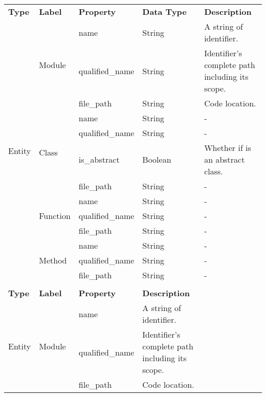 \begin{tabular}{|p{1.6cm}|p{1.7cm}|p{2cm}|p{3.3cm}|p{7.5cm}|}
\hline
\textbf{Type} & \textbf{Label} & \textbf{Property} & \textbf{Data Type} & \textbf{Description} \\
\cline{1-1}\cline{2-2}\cline{3-3}\cline{4-4}\cline{5-5}
\multirow{13}{*}{Entity} & \multirow{3}{*}{Module} & name & String & A string of identifier. \\
\cline{3-3}\cline{4-4}\cline{5-5}
 &  & qualified\_name & String & Identifier's complete path including its scope. \\
\cline{3-3}\cline{4-4}\cline{5-5}
 &  & file\_path & String & Code location. \\
\cline{2-2}\cline{3-3}\cline{4-4}\cline{5-5}
 & \multirow{4}{*}{Class} & name & String & - \\
\cline{3-3}\cline{4-4}\cline{5-5}
 &  & qualified\_name & String & - \\
\cline{3-3}\cline{4-4}\cline{5-5}
 &  & is\_abstract & Boolean & Whether if is an abstract class. \\
\cline{3-3}\cline{4-4}\cline{5-5}
 &  & file\_path & String & - \\
\cline{2-2}\cline{3-3}\cline{4-4}\cline{5-5}
 & \multirow{3}{*}{Function} & name & String & - \\
\cline{3-3}\cline{4-4}\cline{5-5}
 &  & qualified\_name & String & - \\
\cline{3-3}\cline{4-4}\cline{5-5}
 &  & file\_path & String & - \\
\cline{2-2}\cline{3-3}\cline{4-4}\cline{5-5}
 & \multirow{3}{*}{Method} & name & String & - \\
\cline{3-3}\cline{4-4}\cline{5-5}
 &  & qualified\_name & String & - \\
\cline{3-3}\cline{4-4}\cline{5-5}
 &  & file\_path & String & - \\
\cline{1-1}\cline{2-2}\cline{3-3}\cline{4-4}\cline{5-5}
 &  &  &  &  \\
\cline{1-1}\cline{2-2}\cline{3-3}\cline{4-4}\cline{5-5}
\textbf{Type} & \textbf{Label} & \textbf{Property} & \textbf{Description} &  \\
\cline{1-1}\cline{2-2}\cline{3-3}\cline{4-4}\cline{5-5}
\multirow{13}{*}{Entity} & \multirow{3}{*}{Module} & name & A string of identifier. &  \\
\cline{3-3}\cline{4-4}\cline{5-5}
 &  & qualified\_name & Identifier's complete path including its scope. &  \\
\cline{3-3}\cline{4-4}\cline{5-5}
 &  & file\_path & Code location. &  \\

\end{tabular}
